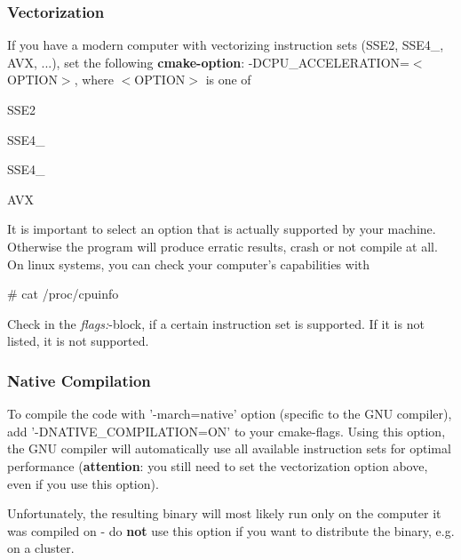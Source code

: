 \subsubsection*{Vectorization}

If you have a modern computer with vectorizing instruction sets (S\-S\-E2, S\-S\-E4\-\_, A\-V\-X, ...), set the following {\bfseries cmake-\/option}\-: -\/\-D\-C\-P\-U\-\_\-\-A\-C\-C\-E\-L\-E\-R\-A\-T\-I\-O\-N=$<$\-O\-P\-T\-I\-O\-N$>$, where $<$\-O\-P\-T\-I\-O\-N$>$ is one of
\begin{DoxyItemize}
\item S\-S\-E2
\item S\-S\-E4\-\_
\item S\-S\-E4\-\_
\item A\-V\-X
\end{DoxyItemize}

It is important to select an option that is actually supported by your machine. Otherwise the program will produce erratic results, crash or not compile at all. On linux systems, you can check your computer's capabilities with \begin{DoxyVerb}  # cat /proc/cpuinfo
\end{DoxyVerb}


Check in the {\itshape flags\-:}-\/block, if a certain instruction set is supported. If it is not listed, it is not supported.

\subsubsection*{Native Compilation}

To compile the code with '-\/march=native' option (specific to the G\-N\-U compiler), add '-\/\-D\-N\-A\-T\-I\-V\-E\-\_\-\-C\-O\-M\-P\-I\-L\-A\-T\-I\-O\-N=O\-N' to your cmake-\/flags. Using this option, the G\-N\-U compiler will automatically use all available instruction sets for optimal performance ({\bfseries attention}\-: you still need to set the vectorization option above, even if you use this option).

Unfortunately, the resulting binary will most likely run only on the computer it was compiled on -\/ do {\bfseries not} use this option if you want to distribute the binary, e.\-g. on a cluster. 